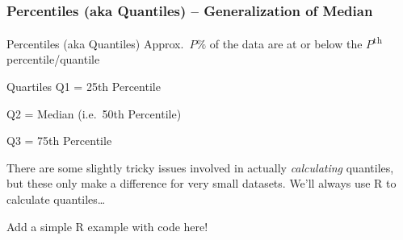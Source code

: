 \begin{frame}
\frametitle{Percentiles (aka Quantiles) -- Generalization of Median}
\begin{block}{Percentiles (aka Quantiles)}
Approx.\ $P\%$ of the data are at or below the $P$\textsuperscript{th} percentile/quantile
\end{block}
\pause
\begin{block}{Quartiles}
Q1 = 25th Percentile

Q2 =  Median (i.e.\ 50th Percentile)

Q3 = 75th Percentile
\end{block}


\vspace{1em}
\alert{There are some slightly tricky issues involved in actually \emph{calculating} quantiles, but these only make a difference for very small datasets. We'll always use R to calculate quantiles\dots}

\end{frame}

\begin{frame}
Add a simple R example with code here!
\end{frame}
%
%
%

